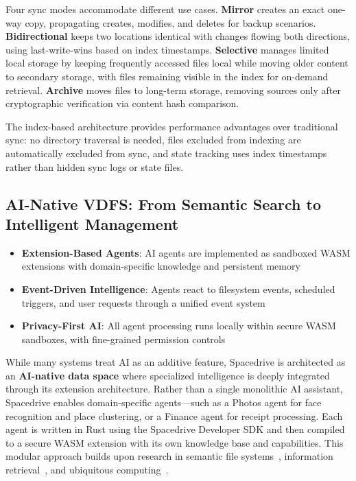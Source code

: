 \documentclass[sigconf]{acmart}
\begin{document}
Four sync modes accommodate different use cases. \textbf{Mirror} creates an exact one-way copy, propagating creates, modifies, and deletes for backup scenarios. \textbf{Bidirectional} keeps two locations identical with changes flowing both directions, using last-write-wins based on index timestamps. \textbf{Selective} manages limited local storage by keeping frequently accessed files local while moving older content to secondary storage, with files remaining visible in the index for on-demand retrieval. \textbf{Archive} moves files to long-term storage, removing sources only after cryptographic verification via content hash comparison.

The index-based architecture provides performance advantages over traditional sync: no directory traversal is needed, files excluded from indexing are automatically excluded from sync, and state tracking uses index timestamps rather than hidden sync logs or state files.

\subsection{AI-Native VDFS: From Semantic Search to Intelligent Management}
\label{sec:ai-native}

\begin{keytakeaways}
\begin{itemize}[noitemsep, topsep=0pt]
\item \textbf{Extension-Based Agents}: AI agents are implemented as sandboxed WASM extensions with domain-specific knowledge and persistent memory
\item \textbf{Event-Driven Intelligence}: Agents react to filesystem events, scheduled triggers, and user requests through a unified event system
\item \textbf{Privacy-First AI}: All agent processing runs locally within secure WASM sandboxes, with fine-grained permission controls
\end{itemize}
\end{keytakeaways}

While many systems treat AI as an additive feature, Spacedrive is architected as an \textbf{AI-native data space} where specialized intelligence is deeply integrated through its extension architecture. Rather than a single monolithic AI assistant, Spacedrive enables domain-specific agents—such as a Photos agent for face recognition and place clustering, or a Finance agent for receipt processing. Each agent is written in Rust using the Spacedrive Developer SDK and then compiled to a secure WASM extension with its own knowledge base and capabilities. This modular approach builds upon research in semantic file systems~\cite{gifford_sfs_1991}, information retrieval~\cite{dumais_stuff_2003}, and ubiquitous computing~\cite{weiser_ubiquitous_1991}.
\end{document}
